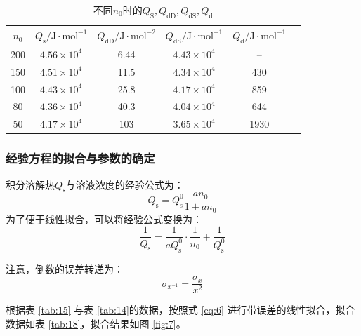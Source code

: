 \documentclass[cn,hazy,pku,12pt,normal,math=newtx,cite=super]{elegantnote}
\begin{document}
\begin{table}[htbp]
    \centering
    \caption{不同$n_0$时的$Q_\mathrm{S},Q_\mathrm{dD},Q_\mathrm{dS},Q_\mathrm{d}$}
    \begin{tabular}{cccccc}
    \toprule
        $n_0$ & $Q_{\mathrm{s}}/\mathrm{J \cdot mol^{-1}}$ & $Q_{\mathrm{dD}}/\mathrm{J \cdot mol^{-2}}$ & $Q_{\mathrm{dS}}/\mathrm{J \cdot mol^{-1}}$ & $Q_{\mathrm{d}}/\mathrm{J \cdot mol^{-1}}$\\
        \midrule
        200 & $4.56 \times 10^{4}$ & 6.44 & $4.43 \times 10^{4}$ & -- \\
        150 & $4.51 \times 10^{4}$ & 11.5 & $4.34 \times 10^{4}$ & 430  \\
        100 & $4.43 \times 10^{4}$ & 25.8 & $4.17 \times 10^{4}$ & 859 \\
        80 & $4.36 \times 10^{4}$ & 40.3 & $4.04 \times 10^{4}$ & 644  \\
        50 & $4.17 \times 10^{4}$ & 103 & $3.65 \times 10^{4}$ & 1930 \\
        \bottomrule
    \end{tabular}
    
    \label{tab:16}
\end{table}

\subsubsection{经验方程的拟合与参数的确定}

积分溶解热$Q_{\mathrm{s}}$与溶液浓度的经验公式为：
\begin{equation}\label{eq:11}
    Q_{\mathrm{s}} = Q_{\mathrm{s}}^0 \frac{an_0}{1+an_0}
\end{equation}
为了便于线性拟合，可以将经验公式变换为：
\begin{equation}\label{eq:6}
    \frac{1}{Q_{\mathrm{s}}}=\frac{1}{aQ_{\mathrm{s}}^0}\cdot\frac{1}{n_0}+\frac{1}{Q_{\mathrm{s}}^0}
\end{equation}

注意，倒数的误差转递为：
\begin{equation*}
    \sigma_{x^{-1}} = \frac{\sigma_{x}}{x^2}
\end{equation*}

根据表 \ref{tab:15} 与表 \ref{tab:14}的数据，按照式 \eqref{eq:6} 进行带误差的线性拟合，拟合数据如表 \ref{tab:18}，拟合结果如图 \ref{fig:7}。
\end{document}
